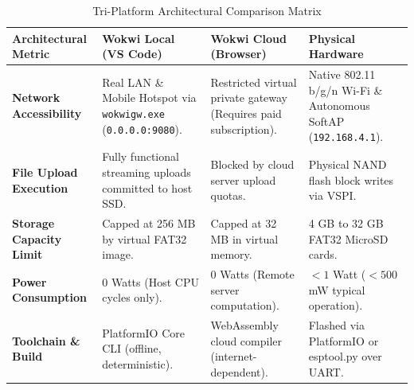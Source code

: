 ﻿\documentclass[conference]{IEEEtran}
\begin{document}
\begin{table}[t]
\caption{Tri-Platform Architectural Comparison Matrix}
\begin{center}
\begin{tabularx}{\textwidth}{p{3.2cm}XXX}
\toprule
\textbf{Architectural Metric} & \textbf{Wokwi Local (VS Code)} & \textbf{Wokwi Cloud (Browser)} & \textbf{Physical Hardware} \\
\midrule
\textbf{Network Accessibility} & Real LAN \& Mobile Hotspot via \texttt{wokwigw.exe} (\texttt{0.0.0.0:9080}). & Restricted virtual private gateway (Requires paid subscription). & Native 802.11 b/g/n Wi-Fi \& Autonomous SoftAP (\texttt{192.168.4.1}). \\
\addlinespace
\textbf{File Upload Execution} & Fully functional streaming uploads committed to host SSD. & Blocked by cloud server upload quotas. & Physical NAND flash block writes via VSPI. \\
\addlinespace
\textbf{Storage Capacity Limit} & Capped at 256 MB by virtual FAT32 image. & Capped at 32 MB in virtual memory. & 4 GB to 32 GB FAT32 MicroSD cards. \\
\addlinespace
\textbf{Power Consumption} & 0 Watts (Host CPU cycles only). & 0 Watts (Remote server computation). & $< 1$ Watt ($< 500$ mW typical operation). \\
\addlinespace
\textbf{Toolchain \& Build} & PlatformIO Core CLI (offline, deterministic). & WebAssembly cloud compiler (internet-dependent). & Flashed via PlatformIO or esptool.py over UART. \\
\bottomrule
\end{tabularx}
\label{tab:triplatform}
\end{center}
\end{table}
\end{document}

